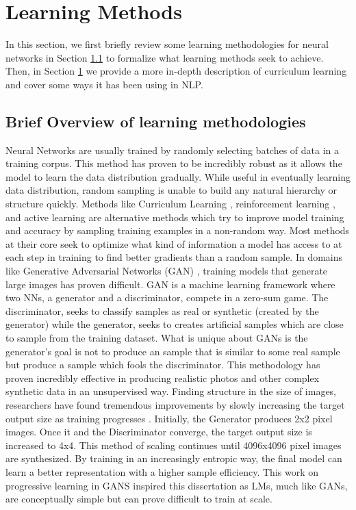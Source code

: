 \section{Learning Methods}
\label{chap:prior:sec:cl}
In this section, we first briefly review some learning methodologies for neural networks in Section \ref{chap:prior:sec:cl:overview} to formalize what learning methods seek to achieve. Then, in Section \ref{chap:prior:sec:cl} we provide a more in-depth description of curriculum learning and cover some ways it has been using in NLP. 
\subsection{Brief Overview of learning methodologies}
\label{chap:prior:sec:cl:overview}
Neural Networks are usually trained by randomly selecting batches of data in a training corpus. This method has proven to be incredibly robust as it allows the model to learn the data distribution gradually. While useful in eventually learning data distribution, random sampling is unable to build any natural hierarchy or structure quickly. Methods like Curriculum Learning \cite{Bengio2009CurriculumL}, reinforcement learning \cite{Sutton1998ReinforcementLA}, and active learning \cite{Cohn1994ActiveLW} are alternative methods which try to improve model training and accuracy by sampling training examples in a non-random way. Most methods at their core seek to optimize what kind of information a model has access to at each step in training to find better gradients than a random sample. In domains like Generative Adversarial Networks (GAN) \cite{Goodfellow2014GenerativeAN}, training models that generate large images has proven difficult. GAN is a machine learning framework where two NNs, a generator and a discriminator, compete in a zero-sum game. The discriminator, seeks to classify samples as real or synthetic (created by the generator) while the generator, seeks to creates artificial samples which are close to sample from the training dataset. What is unique about GANs is the generator's goal is not to produce an sample that is similar to some real sample but produce a sample which fools the discriminator. This methodology has proven incredibly effective in producing realistic photos and other complex synthetic data in an unsupervised way. Finding structure in the size of images, researchers have found tremendous improvements by slowly increasing the target output size as training progresses \cite{Karras2017ProgressiveGO}. Initially, the Generator produces 2x2 pixel images. Once it and the Discriminator converge, the target output size is increased to 4x4. This method of scaling continues until 4096x4096 pixel images are synthesized. By training in an increasingly entropic way, the final model can learn a better representation with a higher sample efficiency. This work on progressive learning in GANS inspired this dissertation as LMs, much like GANs, are conceptually simple but can prove difficult to train at scale. 
